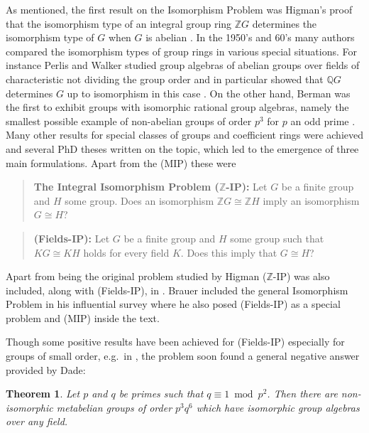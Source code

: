\documentclass[11pt, a4paper]{amsart}
\newtheorem{theorem}{Theorem}[section]
\theoremstyle{definition}
\begin{document}
As mentioned, the first result on the Isomorphism Problem was Higman's proof that the isomorphism type of an integral group ring $\mathbb{Z}G$ determines the isomorphism type of $G$ when $G$ is abelian \cite{Higman40}. In the 1950's and 60's many authors compared the isomorphism types of group rings in various special situations. For instance  Perlis and Walker studied group algebras of abelian groups over fields of characteristic not dividing the group order and in particular showed that $\mathbb{Q}G$ determines $G$ up to isomorphism in this case \cite{PerlisWalker}. On the other hand, Berman was the first to exhibit groups with isomorphic rational group algebras, namely the smallest possible example of non-abelian groups of order $p^3$ for $p$ an odd prime \cite{Berman55}. Many other results for special classes of groups and coefficient rings were achieved and several PhD theses written on the topic, which led to the emergence of three main formulations. Apart from the (MIP) these were

\begin{quote}\textbf{The Integral Isomorphism Problem ($\mathbb{Z}$-IP):} Let $G$ be a finite group and $H$ some group. Does an isomorphism $\mathbb{Z} G \cong \mathbb{Z} H$ imply an isomorphism $G \cong H$? 
\end{quote}

\begin{quote}\textbf{(Fields-IP):} Let $G$ be a finite group and $H$ some group such that $KG \cong KH$ holds for every field $K$. Does this imply that $G \cong H$? 
\end{quote}

Apart from being the original problem studied by Higman ($\mathbb{Z}$-IP) was also included, along with (Fields-IP), in \cite[Section 37]{CR0}. Brauer included the general Isomorphism Problem in his influential survey \cite{Brauer63} where he also posed (Fields-IP) as a special problem and (MIP) inside the text.

Though some positive results have been achieved for (Fields-IP) especially for groups of small order, e.g.\ in \cite{Miah8q}, the problem soon found a general negative answer provided by Dade:

\begin{theorem}\label{th:Dade} \cite{Dade71}
Let $p$ and $q$ be primes such that $q \equiv 1 \bmod p^2$. Then there are non-isomorphic metabelian groups of order $p^3q^6$ which have isomorphic group algebras over any field.
\end{theorem}
\end{document}
